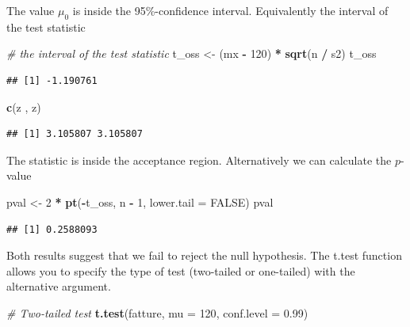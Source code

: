 \documentclass[
]{article}
\newenvironment{Shaded}{\begin{snugshade}}{\end{snugshade}}
\newcommand{\AttributeTok}[1]{\textcolor[rgb]{0.13,0.29,0.53}{#1}}
\newcommand{\CommentTok}[1]{\textcolor[rgb]{0.56,0.35,0.01}{\textit{#1}}}
\newcommand{\ConstantTok}[1]{\textcolor[rgb]{0.56,0.35,0.01}{#1}}
\newcommand{\DecValTok}[1]{\textcolor[rgb]{0.00,0.00,0.81}{#1}}
\newcommand{\FloatTok}[1]{\textcolor[rgb]{0.00,0.00,0.81}{#1}}
\newcommand{\FunctionTok}[1]{\textcolor[rgb]{0.13,0.29,0.53}{\textbf{#1}}}
\newcommand{\NormalTok}[1]{#1}
\newcommand{\OtherTok}[1]{\textcolor[rgb]{0.56,0.35,0.01}{#1}}
\newcommand{\SpecialCharTok}[1]{\textcolor[rgb]{0.81,0.36,0.00}{\textbf{#1}}}
\begin{document}
The value \(\mu_0\) is inside the 95\%-confidence interval. Equivalently
the interval of the test statistic

\begin{Shaded}
\begin{Highlighting}[]
\CommentTok{\# the interval of the test statistic}
\NormalTok{t\_oss }\OtherTok{\textless{}{-}}\NormalTok{ (mx }\SpecialCharTok{{-}} \DecValTok{120}\NormalTok{) }\SpecialCharTok{*} \FunctionTok{sqrt}\NormalTok{(n }\SpecialCharTok{/}\NormalTok{ s2)}
\NormalTok{t\_oss}
\end{Highlighting}
\end{Shaded}

\begin{verbatim}
## [1] -1.190761
\end{verbatim}

\begin{Shaded}
\begin{Highlighting}[]
\FunctionTok{c}\NormalTok{(z , z)}
\end{Highlighting}
\end{Shaded}

\begin{verbatim}
## [1] 3.105807 3.105807
\end{verbatim}

The statistic is inside the acceptance region. Alternatively we can
calculate the \(p\)-value

\begin{Shaded}
\begin{Highlighting}[]
\NormalTok{pval }\OtherTok{\textless{}{-}} \DecValTok{2} \SpecialCharTok{*} \FunctionTok{pt}\NormalTok{(}\SpecialCharTok{{-}}\NormalTok{t\_oss, n }\SpecialCharTok{{-}} \DecValTok{1}\NormalTok{, }\AttributeTok{lower.tail =} \ConstantTok{FALSE}\NormalTok{)}
\NormalTok{pval}
\end{Highlighting}
\end{Shaded}

\begin{verbatim}
## [1] 0.2588093
\end{verbatim}

Both results suggest that we fail to reject the null hypothesis. The
t.test function allows you to specify the type of test (two-tailed or
one-tailed) with the alternative argument.

\begin{Shaded}
\begin{Highlighting}[]
\CommentTok{\# Two{-}tailed test}
\FunctionTok{t.test}\NormalTok{(fatture, }\AttributeTok{mu =} \DecValTok{120}\NormalTok{, }\AttributeTok{conf.level =} \FloatTok{0.99}\NormalTok{)}
\end{Highlighting}
\end{Shaded}
\end{document}
